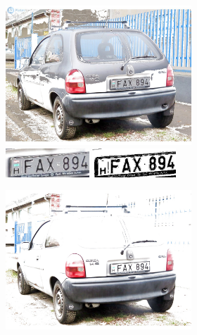 \begin{figure}
\begin{subfigure}[b]{\textwidth}
\begin{subfigure}[b]{.4\textwidth}
            \includegraphics[width=\textwidth]{figures/snow.jpg}
            \includegraphics[width=0.45\textwidth]{figures/weather-results/cutouts/snow_0.jpg}
            \includegraphics[width=0.45\textwidth]{figures/weather-results/cleared/snow_0.jpg}
        \end{subfigure}
        \begin{subfigure}[b]{.4\textwidth}
            \centering
            \includegraphics[width=\textwidth]{figures/sunny.jpg}

\end{subfigure}
\end{subfigure}
\end{figure}

